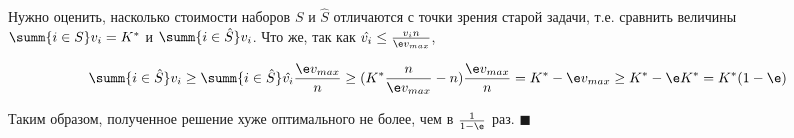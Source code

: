 Нужно оценить, насколько стоимости наборов $S$ и $\hat S$ отличаются с точки зрения старой задачи, т.е. сравнить величины $\summ{i\in S}v_i = K^*$ и $\summ{i\in\hat S}v_i$. Что же, так как $\hat{v_i} \leq \frac{v_i n}{\e v_{max}}$,

$$\summ{i\in\hat S}v_i \geq \summ{i\in\hat S} \hat{v_i} \frac{\e v_{max}}{n} \geq (K^*\frac{n}{\e v_{max}} - n)\frac{\e v_{max}}{n} = K^* - \e v_{max} \geq K^* - \e K^* = K^*(1-\e)$$

Таким образом, полученное решение  хуже оптимального не более, чем в $\frac{1}{1-\e}$ раз. $\blacksquare$